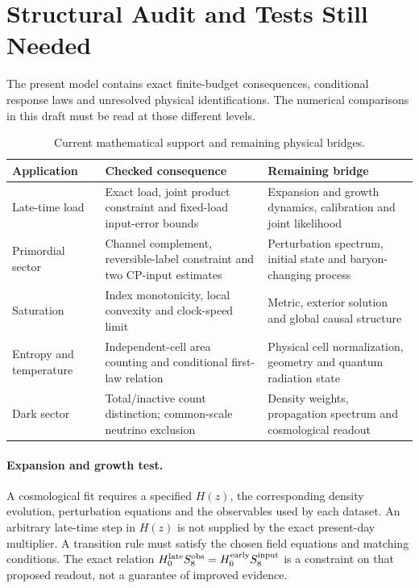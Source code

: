 \section{Structural Audit and Tests Still Needed}
The present model contains exact finite-budget consequences, conditional response laws and unresolved physical identifications. The numerical comparisons in this draft must be read at those different levels.

\begin{table}[t]
\centering
\caption{Current mathematical support and remaining physical bridges.}
\begin{tabularx}{\textwidth}{lXX}
\toprule
Application & Checked consequence & Remaining bridge\\
\midrule
Late-time load & Exact load, joint product constraint and fixed-load input-error bounds & Expansion and growth dynamics, calibration and joint likelihood\\
Primordial sector & Channel complement, reversible-label constraint and two CP-input estimates & Perturbation spectrum, initial state and baryon-changing process\\
Saturation & Index monotonicity, local convexity and clock-speed limit & Metric, exterior solution and global causal structure\\
Entropy and temperature & Independent-cell area counting and conditional first-law relation & Physical cell normalization, geometry and quantum radiation state\\
Dark sector & Total/inactive count distinction; common-scale neutrino exclusion & Density weights, propagation spectrum and cosmological readout\\
\bottomrule
\end{tabularx}
\end{table}

\paragraph{Expansion and growth test.}
A cosmological fit requires a specified $H(z)$, the corresponding density evolution, perturbation equations and the observables used by each dataset. An arbitrary late-time step in $H(z)$ is not supplied by the exact present-day multiplier. A transition rule must satisfy the chosen field equations and matching conditions. The exact relation $H_0^{\rm late}S_8^{\rm obs}=H_0^{\rm early}S_8^{\rm input}$ is a constraint on that proposed readout, not a guarantee of improved evidence.

